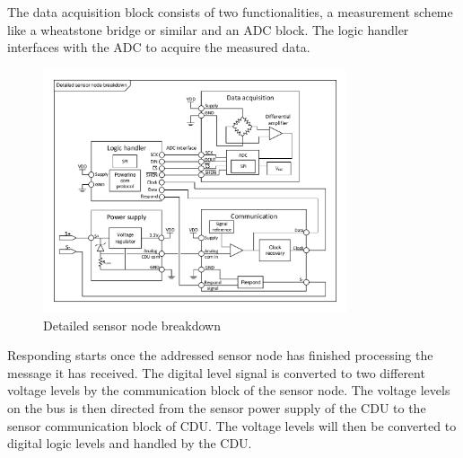 The data acquisition block consists of two functionalities, a measurement scheme like a wheatstone bridge or similar and an ADC block. The logic handler interfaces with the ADC to acquire the measured data.
\begin{figure}[H]
	\centering
	\includegraphics[width=0.8\textwidth]{billeder/11ProjectDescription/SN_detailed_design}
	\caption{Detailed sensor node breakdown}
	\label{fig:SN_detailed}
\end{figure}
Responding starts once the addressed sensor node has finished processing the message it has received. The digital level signal is converted to two different voltage levels by the communication block of the sensor node. The voltage levels on the bus is then directed from the sensor power supply of the CDU to the sensor communication block of CDU. The voltage levels will then be converted to digital logic levels and handled by the CDU.

